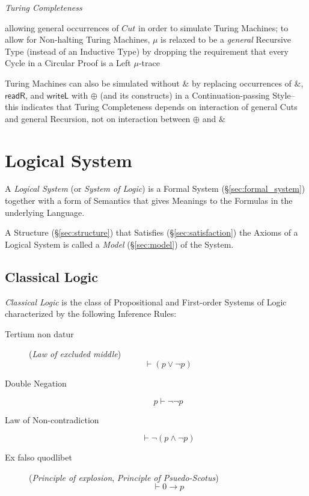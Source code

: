 \emph{Turing Completeness}

allowing general occurrences of $Cut$ in order to simulate Turing
Machines; to allow for Non-halting Turing Machines, $\mu$ is relaxed
to be a \emph{general} Recursive Type (instead of an Inductive Type)
by dropping the requirement that every Cycle in a Circular Proof is a
Left $\mu$-trace

Turing Machines can also be simulated without $\&$ by replacing
occurrences of $\&$, $\mathsf{readR}$, and $\mathsf{writeL}$ with
$\oplus$ (and its constructs) in a Continuation-passing Style-- this
indicates that Turing Completeness depends on interaction of general
Cuts and general Recursion, not on interaction between $\oplus$ and
$\&$



\section{Logical System}\label{sec:logical_system}

A \emph{Logical System} (or \emph{System of Logic}) is a Formal System
(\S\ref{sec:formal_system}) together with a form of Semantics that
gives Meanings to the Formulas in the underlying Language.

A Structure (\S\ref{sec:structure}) that Satisfies
(\S\ref{sec:satisfaction}) the Axioms of a Logical System is called a
\emph{Model} (\S\ref{sec:model}) of the System.



\subsection{Classical Logic}\label{sec:classical_logic}

\emph{Classical Logic} is the class of Propositional and
First-order Systems of Logic characterized by the following Inference
Rules:

\begin{description}

\item [Tertium non datur] (\emph{Law of excluded middle})
  \[
    \vdash(p \vee \neg p)
  \]

\item [Double Negation]
  \[
    p \vdash \neg\neg p
  \]

\item [Law of Non-contradiction]
  \[
    \vdash \neg(p \wedge \neg p)
  \]

\item [Ex falso quodlibet] (\emph{Principle of explosion},
  \emph{Principle of Psuedo-Scotus})
  \[
    \vdash 0 \rightarrow p
  \]


\end{description}


